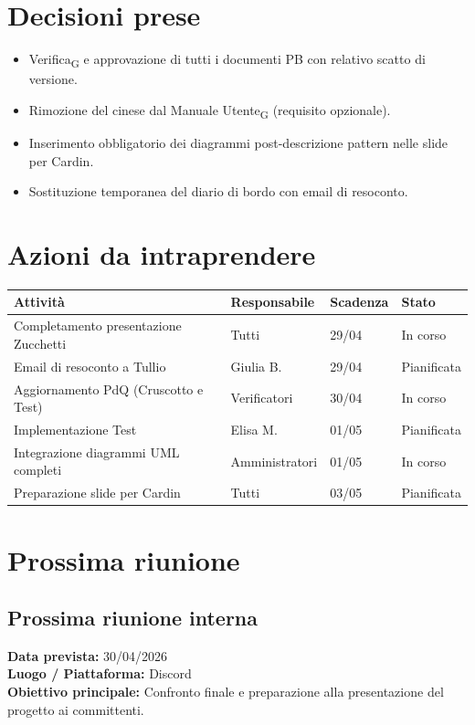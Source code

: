 \documentclass[a4paper,12pt]{article}
\newcommand{\gls}[1]{#1\textsubscript{G}}
\begin{document}
\section*{Decisioni prese}
\begin{itemize}
    \item \gls{Verifica} e approvazione di tutti i documenti PB con relativo scatto di versione.
    \item Rimozione del cinese dal \gls{Manuale Utente} (requisito opzionale).
    \item Inserimento obbligatorio dei diagrammi post-descrizione pattern nelle slide per Cardin.
    \item Sostituzione temporanea del diario di bordo con email di resoconto.
\end{itemize}


\section*{Azioni da intraprendere}
\begin{longtable}{|p{}|p{}|p{}|p{}|}
\hline
\textbf{Attività} & \textbf{Responsabile} & \textbf{Scadenza} & \textbf{Stato} \\ \hline
Completamento presentazione Zucchetti & Tutti & 29/04 & In corso \\ \hline
Email di resoconto a Tullio & Giulia B. & 29/04 & Pianificata \\ \hline
Aggiornamento PdQ (Cruscotto e Test) & Verificatori & 30/04 & In corso \\ \hline
Implementazione Test & Elisa M. & 01/05 & Pianificata \\ \hline
Integrazione diagrammi UML completi & Amministratori & 01/05 & In corso \\ \hline
Preparazione slide per Cardin & Tutti & 03/05 & Pianificata \\ \hline
\end{longtable}



\section*{Prossima riunione}
\subsection*{Prossima riunione interna}
\textbf{Data prevista:} 30/04/2026 \\
\textbf{Luogo / Piattaforma:} Discord \\
\textbf{Obiettivo principale:} Confronto finale e preparazione alla presentazione del progetto ai committenti. \\
\end{document}
